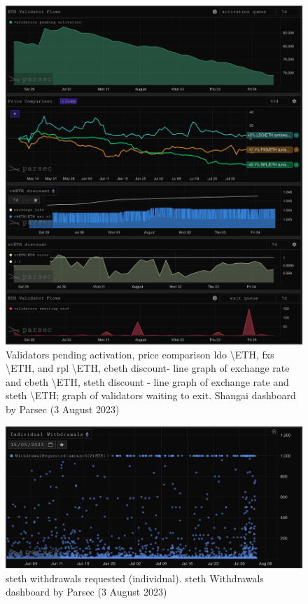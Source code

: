 \documentclass[UTF8]{article}
\begin{document}
\begin{figure}[htbp]
\begin{center}
\includegraphics[width=\linewidth]{images/parsec2}
\caption{Validators pending activation, price comparison \gls{ldo} \textbackslash ETH, \gls{fxs} \textbackslash ETH, and \gls{rpl} \textbackslash ETH, \gls{cbeth} discount- line graph of exchange rate and \gls{cbeth} \textbackslash ETH, \gls{steth} discount - line graph of exchange rate and \gls{steth} \textbackslash ETH; graph of validators waiting to exit. Shangai dashboard by Parsec (3 August 2023)}
\label{fig:parsec2}
\end{center}
\end{figure}

\begin{figure}[htbp]
\begin{center}
\includegraphics[width=\linewidth]{images/parsec3}
\caption{\gls{steth} withdrawals requested (individual). \gls{steth} Withdrawals dashboard by Parsec (3 August 2023)}
\label{fig:parsec3}
\end{center}
\end{figure}
\end{document}
